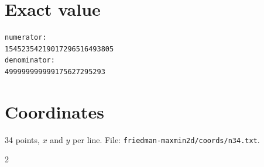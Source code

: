 \documentclass[11pt,a4paper]{article}
\begin{document}
\appendix
\section{Exact value}
{\small
\begin{verbatim}
numerator:
15452354219017296516493805
denominator:
499999999999175627295293
\end{verbatim}}

\section{Coordinates}
34 points, $x$ and $y$ per line. File: \texttt{friedman-maxmin2d/coords/n34.txt}.
{\tiny
\begin{multicols}{2}
\end{multicols}}
\end{document}

